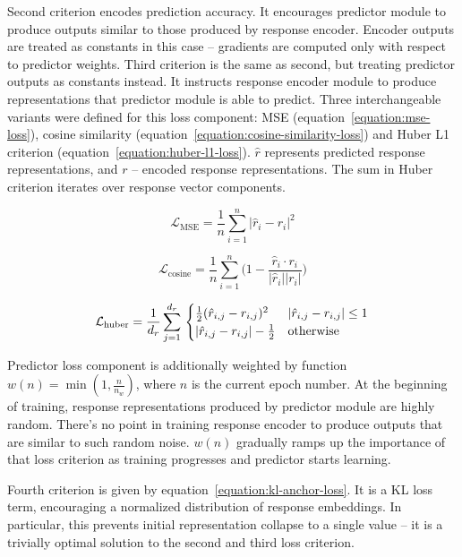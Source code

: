 \documentclass[a4paper,11pt,twoside]{report}
\theoremstyle{definition}
\begin{document}
Second criterion encodes prediction accuracy. It encourages predictor module to produce outputs similar to those produced by response encoder. Encoder outputs are treated as constants in this case -- gradients are computed only with respect to predictor weights. Third criterion is the same as second, but treating predictor outputs as constants instead. It instructs response encoder module to produce representations that predictor module is able to predict. Three interchangeable variants were defined for this loss component: MSE (equation~\ref{equation:mse-loss}), cosine similarity (equation~\ref{equation:cosine-similarity-loss}) and Huber L1 criterion (equation~\ref{equation:huber-l1-loss}). $\hat{r}$ represents predicted response representations, and $r$ -- encoded response representations. The sum in Huber criterion iterates over response vector components. 

\begin{equation}
\label{equation:mse-loss}
    \mathcal{L}_\text{MSE} = \frac{1}{n} \sum_{i=1}^{n} \bigl|\hat{r}_{i} - r_{i}\bigr|^2
\end{equation}

\begin{equation}
\label{equation:cosine-similarity-loss}
    \mathcal{L}_\text{cosine} = \frac{1}{n} \sum_{i=1}^{n} \bigl(1 - \frac{\hat{r}_i \cdot r_i}{|\hat{r}_i| |r_i|}\bigr)
\end{equation}

\begin{equation}
\label{equation:huber-l1-loss}
    \mathcal{L}_\text{huber} = \frac{1}{d_r}\sum_{j=1}^{d_r} \\
    \begin{cases} 
        \tfrac{1}{2} (\hat{r}_{i,j} - r_{i,j})^2 & |\hat{r}_{i,j} - r_{i,j}| \le 1 \\
        |\hat{r}_{i,j} - r_{i,j}| - \tfrac{1}{2} & \text{otherwise} 
    \end{cases} 
\end{equation}

Predictor loss component is additionally weighted by function $w(n) = \min(1, \frac{n}{n_w})$, where $n$ is the current epoch number. At the beginning of training, response representations produced by predictor module are highly random. There's no point in training response encoder to produce outputs that are similar to such random noise. $w(n)$ gradually ramps up the importance of that loss criterion as training progresses and predictor starts learning. 

Fourth criterion is given by equation~\ref{equation:kl-anchor-loss}. It is a KL loss \cite{kingma2014vae} term, encouraging a normalized distribution of response embeddings. In particular, this prevents initial representation collapse to a single value -- it is a trivially optimal solution to the second and third loss criterion.
\end{document}
